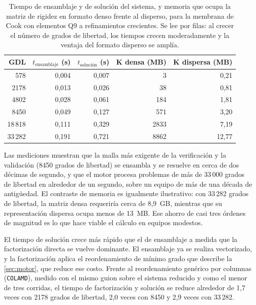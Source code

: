 \begin{table}[htbp]
\centering
\caption[Tiempos de ensamblaje y solución, y memoria de la matriz de rigidez (Cook Q9).]{Tiempo de ensamblaje y de solución del sistema, y memoria que ocupa la matriz de rigidez en formato denso frente al disperso, para la membrana de Cook con elementos Q9 a refinamientos crecientes. Se lee por filas: al crecer el número de grados de libertad, los tiempos crecen moderadamente y la ventaja del formato disperso se amplía.}
\label{tab:tiempos}
\begin{tabular}{r r r r r}
\toprule
GDL & $t_{\text{ensamblaje}}$ (s) & $t_{\text{solución}}$ (s) & $\bm{K}$ densa (MB) & $\bm{K}$ dispersa (MB) \\
\midrule
578   & 0,004 & 0,007 & 3    & 0,21  \\
2178  & 0,013 & 0,026 & 38   & 0,81  \\
4802  & 0,028 & 0,061 & 184  & 1,81  \\
8450  & 0,049 & 0,127 & 571  & 3,20  \\
18\,818 & 0,111 & 0,329 & 2833 & 7,19  \\
33\,282 & 0,191 & 0,721 & 8862 & 12,77 \\
\bottomrule
\end{tabular}
{\singlespacing{}}
\end{table}

Las mediciones muestran que la malla más exigente de la verificación y la validación (8450 grados de libertad) se ensambla y se resuelve en cerca de dos décimas de segundo, y que el motor procesa problemas de más de 33\,000 grados de libertad en alrededor de un segundo, sobre un equipo de más de una década de antigüedad. El contraste de memoria es igualmente ilustrativo: con 33\,282 grados de libertad, la matriz densa requeriría cerca de 8,9~GB, mientras que su representación dispersa ocupa menos de 13~MB. Ese ahorro de casi tres órdenes de magnitud es lo que hace viable el cálculo en equipos modestos.

El tiempo de solución crece más rápido que el de ensamblaje a medida que la factorización directa se vuelve dominante. El ensamblaje ya se realiza vectorizado, y la factorización aplica el reordenamiento de mínimo grado que describe la \autoref{sec:motor}, que reduce ese costo. Frente al reordenamiento genérico por columnas (\texttt{COLAMD}), medido con el mismo guion sobre el sistema reducido y como el menor de tres corridas, el tiempo de factorización y solución se reduce alrededor de 1,7 veces con 2178 grados de libertad, 2,0 veces con 8450 y 2,9 veces con 33\,282.

